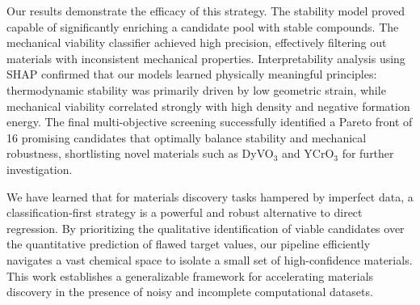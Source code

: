 \documentclass[]{article}
\begin{document}
Our results demonstrate the efficacy of this strategy. The stability model proved capable of significantly enriching a candidate pool with stable compounds. The mechanical viability classifier achieved high precision, effectively filtering out materials with inconsistent mechanical properties. Interpretability analysis using SHAP confirmed that our models learned physically meaningful principles: thermodynamic stability was primarily driven by low geometric strain, while mechanical viability correlated strongly with high density and negative formation energy. The final multi-objective screening successfully identified a Pareto front of 16 promising candidates that optimally balance stability and mechanical robustness, shortlisting novel materials such as DyVO$_3$ and YCrO$_3$ for further investigation.

We have learned that for materials discovery tasks hampered by imperfect data, a classification-first strategy is a powerful and robust alternative to direct regression. By prioritizing the qualitative identification of viable candidates over the quantitative prediction of flawed target values, our pipeline efficiently navigates a vast chemical space to isolate a small set of high-confidence materials. This work establishes a generalizable framework for accelerating materials discovery in the presence of noisy and incomplete computational datasets.


{}

\end{document}

